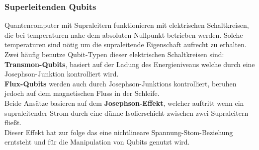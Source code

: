 \subsubsection{Superleitenden Qubits}
\label{subsub:superleiter}
Quantencomputer mit Supraleitern funktionieren mit elektrischen Schaltkreisen, die bei temperaturen nahe dem absoluten Nullpunkt betrieben werden. Solche temperaturen sind nötig
um die supraleitende Eigenschaft aufrecht zu erhalten.\\

Zwei häufig benutze Qubit-Typen dieser elektrischen Schaltkreisen sind:\\
\textbf{Transmon-Qubits}, basiert auf der Ladung des Energieniveaus welche durch eine Josephson-Junktion kontrolliert wird.\\
\textbf{Flux-Qubits} werden auch durch Josephson-Junktions kontrolliert, beruhen jedoch auf dem magnetischen Fluss in der Schleife.\\

Beide Ansätze basieren auf dem \textbf{Josephson-Effekt}, welcher auftritt wenn ein supraleitender Strom durch eine dünne Isolierschicht zwischen zwei Supraleitern fließt.\\
Dieser Effekt hat zur folge das eine nichtlineare Spannung-Stom-Beziehung erntsteht und für die Manipulation von Qubits genutzt wird.\\


